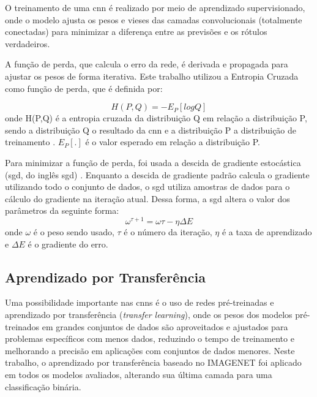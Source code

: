 O treinamento de uma \acrshort{cnn} é realizado por meio de aprendizado supervisionado, onde o modelo ajusta os pesos e vieses das camadas convolucionais (totalmente conectadas) para minimizar a diferença entre as previsões e os rótulos verdadeiros.

A função de perda, que calcula o erro da rede, é derivada e propagada para ajustar os pesos de forma iterativa. 
Este trabalho utilizou a Entropia Cruzada como função de perda, que é definida por:

\begin{equation}
    \label{eqn:crossentropy}
    H(P,Q) = -E_{P}[log Q]
\end{equation}
onde H(P,Q) é a entropia cruzada da distribuição Q em relação a distribuição P, sendo a distribuição Q o resultado da \acrshort{cnn} e a distribuição P a distribuição de treinamento \cite{mao2023}. 
$E_{P}[.]$ é o valor esperado em relação a distribuição P.

Para minimizar a função de perda, foi usada a descida de gradiente estocástica (\acrshort{sgd}, do inglês \acrlong{sgd}) \cite{ruder2016}. Enquanto a descida de gradiente padrão calcula o gradiente utilizando todo o conjunto de dados, o \acrshort{sgd} utiliza amostras de dados para o cálculo do gradiente na iteração atual.
Dessa forma, a \acrshort{sgd} altera o valor dos parâmetros da seguinte forma:
\begin{equation}
    \label{eqn:sgd}
    \omega^{\tau+1} = \omega{\tau} - \eta\Delta{E}
\end{equation}
onde $\omega$ é o peso sendo usado, $\tau$ é o número da iteração, $\eta$ é a taxa de aprendizado e $\Delta{E}$ é o gradiente do erro.

\subsection{Aprendizado por Transferência}
Uma possibilidade importante nas \acrshort{cnn}s é o uso de redes pré-treinadas e aprendizado por transferência (\textit{transfer learning}), 
onde os pesos dos modelos pré-treinados em grandes conjuntos de dados são aproveitados e ajustados para problemas específicos com menos dados, 
reduzindo o tempo de treinamento e melhorando a precisão em aplicações com conjuntos de dados menores. 
Neste trabalho, o aprendizado por transferência baseado no IMAGENET \cite{deng2009imagenet} foi aplicado em todos os modelos avaliados, alterando sua última camada para uma classificação binária.
